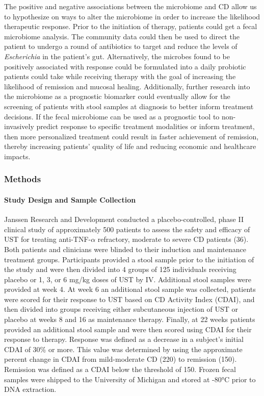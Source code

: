 \documentclass[11pt,]{article}
\let\oldparagraph\paragraph
\renewcommand{\paragraph}[1]{\oldparagraph{#1}\mbox{}}
\begin{document}
The positive and negative associations between the microbiome and CD
allow us to hypothesize on ways to alter the microbiome in order to
increase the likelihood therapeutic response. Prior to the initiation of
therapy, patients could get a fecal microbiome analysis. The community
data could then be used to direct the patient to undergo a round of
antibiotics to target and reduce the levels of \emph{Escherichia} in the
patient's gut. Alternatively, the microbes found to be positively
associated with response could be formulated into a daily probiotic
patients could take while receiving therapy with the goal of increasing
the likelihood of remission and mucosal healing. Additionally, further
research into the microbiome as a prognostic biomarker could eventually
allow for the screening of patients with stool samples at diagnosis to
better inform treatment decisions. If the fecal microbiome can be used
as a prognostic tool to non-invasively predict response to specific
treatment modalities or inform treatment, then more personalized
treatment could result in faster achievement of remission, thereby
increasing patients' quality of life and reducing economic and
healthcare impacts.

\newpage

\subsubsection{Methods}\label{methods}

\paragraph{Study Design and Sample
Collection}\label{study-design-and-sample-collection}

Janssen Research and Development conducted a placebo-controlled, phase
II clinical study of approximately 500 patients to assess the safety and
efficacy of UST for treating anti-TNF-\({\alpha}\) refractory, moderate
to severe CD patients (36). Both patients and clinicians were blinded to
their induction and maintenance treatment groups. Participants provided
a stool sample prior to the initiation of the study and were then
divided into 4 groups of 125 individuals receiving placebo or 1, 3, or 6
mg/kg doses of UST by IV. Additional stool samples were provided at week
4. At week 6 an additional stool sample was collected, patients were
scored for their response to UST based on CD Activity Index (CDAI), and
then divided into groups receiving either subcutaneous injection of UST
or placebo at weeks 8 and 16 as maintenance therapy. Finally, at 22
weeks patients provided an additional stool sample and were then scored
using CDAI for their response to therapy. Response was defined as a
decrease in a subject's initial CDAI of 30\% or more. This value was
determined by using the approximate percent change in CDAI from
mild-moderate CD (220) to remission (150). Remission was defined as a
CDAI below the threshold of 150. Frozen fecal samples were shipped to
the University of Michigan and stored at -80°C prior to DNA extraction.
\end{document}

